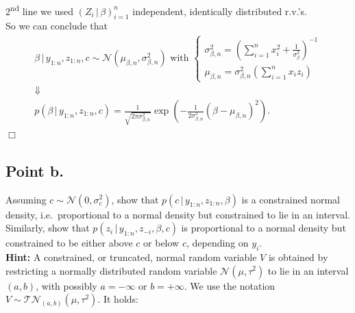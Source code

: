 \documentclass[
  11pt,
]{article}
\begin{document}
2\textsuperscript{nd} line we used
\(\left(Z_i \,|\,\beta\right)_{i = 1}^n\) independent, identically
distributed r.v.'s.\\
So we can conclude that \begin{gather*}
        \beta \,|\,y_{1:n}, z_{1:n}, c \sim \mathcal{N}\left(\mu_{\beta, n},\sigma_{\beta, n}^2\right) \text{ with } 
        \begin{cases}
            \sigma_{\beta, n}^2 = \left(\sum_{i = 1}^{n} x_i^2 + \frac{1}{\sigma_\beta^2}\right)^{-1} \\
            \mu_{\beta, n} = \sigma_{\beta, n}^2 \left(\sum_{i = 1}^{n} x_i z_i \right)
        \end{cases} \\
        \Downarrow \\
        p(\beta \,|\,y_{1:n}, z_{1:n}, c) = \frac{1}{\sqrt{2\pi\sigma_{\beta, n}^2}} \operatorname{exp}\left(-\frac{1}{2 \sigma_{\beta, n}^2} (\beta - \mu_{\beta, n})^2\right).
    \end{gather*} \hfill \ensuremath{\Box}

\hypertarget{point-b.}{%
\subsection{Point b.}\label{point-b.}}

Assuming \(c \sim \mathcal{N}\left(0,\sigma_c^2\right)\), show that
\(p(c \,|\,y_{1:n}, z_{1:n}, \beta)\) is a constrained normal density,
i.e.~proportional to a normal density but constrained to lie in an
interval. Similarly, show that \(p(z_i \,|\,y_{1:n}, z_{-i}, \beta, c)\)
is proportional to a normal density but constrained to be either above
\(c\) or below \(c\), depending on \(y_i\).\\
\textbf{Hint:} A constrained, or truncated, normal random variable \(V\)
is obtained by restricting a normally distributed random variable
\(\mathcal{N}\left(\mu,\tau^2\right)\) to lie in an interval \((a, b)\),
with possibly \(a = -\infty\) or \(b = +\infty\). We use the notation
\(V \sim \mathcal{T}\mathcal{N}_{(a,b)}\left(\mu,\tau^2\right)\). It
holds:
\end{document}
